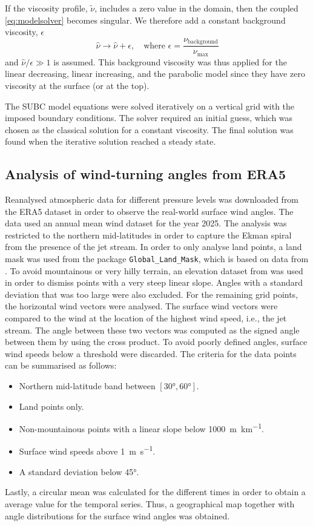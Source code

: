 If the viscosity profile, $\tilde\nu$, includes a zero value in the domain, then the coupled \autoref{eq:modelsolver} becomes singular. We therefore add a constant background viscosity, $\epsilon$
\begin{equation}
    \hat{\nu}\rightarrow\hat{\nu}+\epsilon, \quad \text{where } \epsilon=\frac{\nu_\text{background}}{\nu_\text{max}}
\end{equation}
and $\hat{\nu}/\epsilon\gg1$ is assumed. This background viscosity was thus applied for the linear decreasing, linear increasing, and the parabolic model since they have zero viscosity at the surface (or at the top).

The SUBC model equations were solved iteratively on a vertical grid with the imposed boundary conditions. The solver required an initial guess, which was chosen as the classical solution for a constant viscosity. The final solution was found when the iterative solution reached a steady state.

\subsection{Analysis of wind-turning angles from ERA5}
Reanalysed atmospheric data for different pressure levels was downloaded from the ERA5 dataset \citep{copernicusclimatechangeservice2019} in order to observe the real-world surface wind angles. The data used an annual mean wind dataset for the year 2025. The analysis was restricted to the northern mid-latitudes in order to capture the Ekman spiral from the presence of the jet stream. In order to only analyse land points, a land mask was used from the package \texttt{Global\_Land\_Mask}, which is based on data from \citet{noaanationalcentersforenvironmentalinformation1999}. To avoid mountainous or very hilly terrain, an elevation dataset from \citet{noaanationalcentersforenvironmentalinformation2022} was used in order to dismiss points with a very steep linear slope. Angles with a standard deviation that was too large were also excluded. For the remaining grid points, the horizontal wind vectors were analysed. The surface wind vectors were compared to the wind at the location of the highest wind speed, i.e., the jet stream. The angle between these two vectors was computed as the signed angle between them by using the cross product. To avoid poorly defined angles, surface wind speeds below a threshold were discarded. The criteria for the data points can be summarised as follows:
\begin{itemize}
\item Northern mid-latitude band between $\left[\ang{30}, \ang{60}\right]$.
\item Land points only.
\item Non-mountainous points with a linear slope below \SI{1000}{\meter\per\kilo\meter}.
\item Surface wind speeds above \SI{1}{\meter\per\second}.
\item A standard deviation below \ang{45}. 
\end{itemize}
Lastly, a circular mean was calculated for the different times in order to obtain a average value for the temporal series. Thus, a geographical map together with angle distributions for the surface wind angles was obtained.